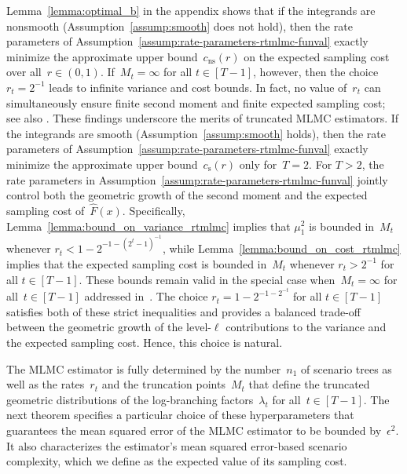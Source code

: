 \documentclass[11pt]{article}
\let\hat\widehat
\begin{document}
\begin{rem}\label{remark:optimal-prob} 
Lemma~\ref{lemma:optimal_b} in the appendix shows that if the integrands are nonsmooth (Assumption~\ref{assump:smooth} does not hold), then the rate parameters of Assumption~\ref{assump:rate-parameters-rtmlmc-funval} exactly minimize the approximate upper bound~$c_{\mathrm{ns}}(r)$ on the expected sampling cost over all~$r\in(0,1)$. If~$M_t = \infty$ for all $t\in[T-1]$, however, then the choice $r_t = 2^{-1}$ leads to infinite variance and cost bounds. In fact, no value of~$r_t$ can simultaneously ensure finite second moment and finite expected sampling cost; see also \cite{syed2023optimal}. These findings underscore the merits of truncated MLMC estimators. If the integrands are smooth (Assumption~\ref{assump:smooth} holds), then the rate parameters of Assumption~\ref{assump:rate-parameters-rtmlmc-funval} exactly minimize the approximate upper bound~$c_{\mathrm{s}}(r)$ only for~$T=2$. For $T > 2$, the rate parameters in Assumption~\ref{assump:rate-parameters-rtmlmc-funval} jointly control both the geometric growth of the second moment and the expected sampling cost of~$\hat{F}(x)$. Specifically, Lemma~\ref{lemma:bound_on_variance_rtmlmc} implies that $\mu_1^2$ is bounded in~$M_t$ whenever $r_t < 1 - 2^{-1 - (2^t - 1)^{-1}}$, while Lemma~\ref{lemma:bound_on_cost_rtmlmc} implies that the expected sampling cost is bounded in~$M_t$ whenever $r_t > 2^{-1}$ for all $t \in [T-1]$. These bounds remain valid in the special case when~$M_t=\infty$ for all~$t\in[T-1]$ addressed in~\citep{syed2023optimal}. The choice $r_t = 1 - 2^{-1 - 2^{-t}}$ for all $t \in [T-1]$ satisfies both of these strict inequalities and provides a balanced trade-off between the geometric growth of the level-$\ell$ contributions to the variance and the expected sampling cost. Hence, this choice is natural. 
\end{rem}


The MLMC estimator is fully determined by the number~$n_1$ of scenario trees as well as the rates~$r_t$ and the truncation points~$M_t$ that define the truncated geometric distributions of the log-branching factors~$\lambda_t$ for all~$t \in [T-1]$. The next theorem specifies a particular choice of these hyperparameters that guarantees the mean squared error of the MLMC estimator to be bounded by~$\epsilon^2$. It also characterizes the estimator's mean squared error-based scenario complexity, which we define as the expected value of its sampling cost.
\end{document}
